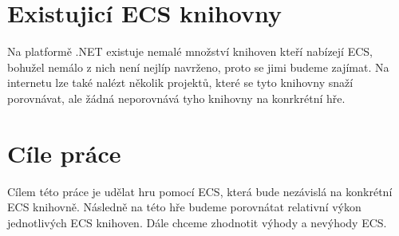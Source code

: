 
\section{Existujicí ECS knihovny}
Na platformě .NET existuje nemalé množství knihoven kteří nabízejí ECS, bohužel nemálo z nich není nejlíp navrženo, proto se jimi budeme zajímat. Na internetu lze také nalézt několik projektů, které se tyto knihovny snaží porovnávat, ale žádná neporovnává tyho knihovny na konrkrétní hře.

\section{Cíle práce}
Cílem této práce je udělat hru pomocí ECS, která bude nezávislá na konkrétní ECS knihovně. Následně na této hře budeme porovnátat relativní výkon jednotlivých ECS knihoven. Dále chceme zhodnotit výhody a nevýhody ECS.



\fi









\iffalse
\chapwithtoc{Introduction}

Introduction should answer the following questions, ideally in this order:
\begin{enumerate}
\item What is the nature of the problem the thesis is addressing?
\item What is the common approach for solving that problem now?
\item How this thesis approaches the problem?
\item What are the results? Did something improve?
\item What can the reader expect in the individual chapters of the thesis?
\end{enumerate}

Expected length of the introduction is between 1--4 pages. Longer introductions may require sub-sectioning with appropriate headings --- use \texttt{\textbackslash{}section*} to avoid numbering (with section names like `Motivation' and `Related work'), but try to avoid lengthy discussion of anything specific. Any ``real science'' (definitions, theorems, methods, data) should go into other chapters.
\todo{You may notice that this paragraph briefly shows different ``types'' of `quotes' in TeX, and the usage difference between a hyphen (-), en-dash (--) and em-dash (---).}

It is very advisable to skim through a book about scientific English writing before starting the thesis. I can recommend `\citetitle{glasman2010science}' by \citet{glasman2010science}.
\fi